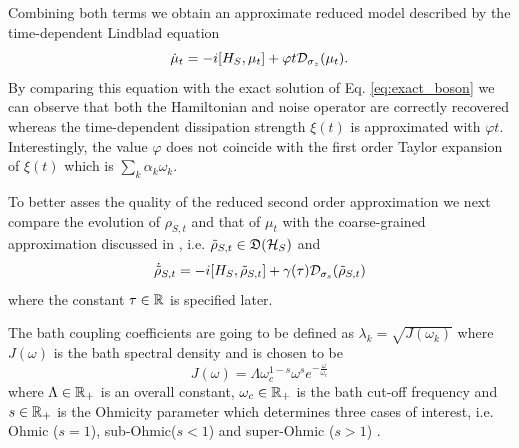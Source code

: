 \documentclass[10pt,aps,pra,twocolumn,showpacs,superscriptaddress,nobalancelastpage,notitlepage,nofootinbib,longbibliography]{revtex4-2}
\begin{document}
Combining both terms we obtain an approximate reduced model described by the time-dependent Lindblad equation
\begin{equation}
    \dot{\mu}_t = -i[H_S,\mu_t] + \varphi t \mathcal{D}_{\sigma_z}(\mu_t).
    \label{eq:time_ordered_boson}
\end{equation} 
By comparing this equation with the exact solution of Eq. \eqref{eq:exact_boson} we can observe that both the Hamiltonian and noise operator are correctly recovered whereas the time-dependent dissipation strength $\xi(t)$ is approximated with $\varphi t$. Interestingly, the value $\varphi$ does not coincide with the first order Taylor expansion of $\xi(t)$ which is $\sum_k\alpha_k\omega_k$.

To better asses the quality of the reduced second order approximation we next compare the evolution of $\rho_{S,t}$ and that of $\mu_t$ with the coarse-grained approximation discussed in \cite[eq. (332)]{lidar2020lecturenotestheoryopen}, i.e. \(\tilde{\rho}_{S,t}\in\mathfrak{D}(\mathcal{H}_S)\) and
\begin{equation}
    \dot{\tilde{\rho}}_{S,t} = -i[H_S,\tilde{\rho}_{S,t}] + \gamma(\tau)\mathcal{D}_{\sigma_s}(\tilde{\rho}_{S,t})
    \label{eq:coarse_grained_boson}
\end{equation}
where the constant $\tau\in\mathbb{R}$ is specified later. 

The bath coupling coefficients are going to be defined as $\lambda_k = \sqrt{J(\omega_k)}$ \cite{tamascelli2020quantum} where $J(\omega)$ is the bath spectral density and is chosen to be 
\begin{equation}
    J(\omega) = \Lambda \omega_c^{1-s} \omega^s e^{-\frac{\omega}{\omega_c}}
\end{equation}
where $\Lambda\in\mathbb{R}_+$ is an overall constant, $\omega_c\in\mathbb{R}_+$ is the bath cut-off frequency and $s\in\mathbb{R}_+$ is the Ohmicity parameter which determines three cases of interest, i.e. Ohmic ($s=1$), sub-Ohmic($s<1$) and super-Ohmic ($s>1$) \cite{PhysRevB.92.195143}.
\end{document}
